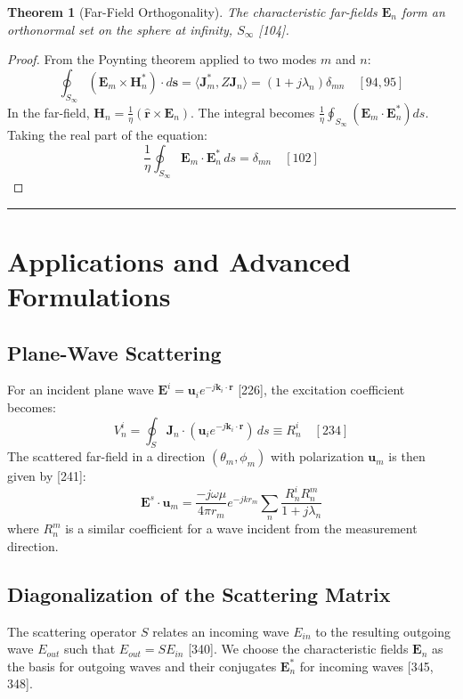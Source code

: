 \documentclass[11pt]{article}
\newcommand{\vect}[1]{\mathbf{#1}}
\newcommand{\sprod}[2]{\langle #1, #2 \rangle}
\newtheorem{theorem}{Theorem}[section]
\theoremstyle{definition}
\begin{document}
\begin{theorem}[Far-Field Orthogonality]
The characteristic far-fields $\vect{E}_n$ form an orthonormal set on the sphere at infinity, $S_\infty$ [104].
\end{theorem}
\begin{proof}
From the Poynting theorem applied to two modes $m$ and $n$:
\[ \oint_{S_\infty} (\vect{E}_m \times \vect{H}_n^*) \cdot d\vect{s} = \sprod{\vect{J}_m^*}{Z\vect{J}_n} = (1+j\lambda_n)\delta_{mn} \quad [94, 95] \]
In the far-field, $\vect{H}_n = \frac{1}{\eta}(\hat{\vect{r}} \times \vect{E}_n)$. The integral becomes $\frac{1}{\eta} \oint_{S_\infty} (\vect{E}_m \cdot \vect{E}_n^*) ds$. Taking the real part of the equation:
\begin{equation}
\frac{1}{\eta} \oint_{S_\infty} \vect{E}_m \cdot \vect{E}_n^* \, ds = \delta_{mn} \quad [102]
\end{equation}
\end{proof}

\hrule\vspace{1.5em}

\section{Applications and Advanced Formulations}

\subsection{Plane-Wave Scattering}
For an incident plane wave $\vect{E}^i = \vect{u}_i e^{-j\vect{k}_i \cdot \vect{r}}$ [226], the excitation coefficient becomes:
\begin{equation}
V_n^i = \oint_S \vect{J}_n \cdot (\vect{u}_i e^{-j\vect{k}_i \cdot \vect{r}}) \, ds \equiv R_n^i \quad [234]
\end{equation}
The scattered far-field in a direction $(\theta_m, \phi_m)$ with polarization $\vect{u}_m$ is then given by [241]:
\begin{equation}
\vect{E}^s \cdot \vect{u}_m = \frac{-j\omega\mu}{4\pi r_m} e^{-jkr_m} \sum_n \frac{R_n^i R_n^m}{1+j\lambda_n}
\end{equation}
where $R_n^m$ is a similar coefficient for a wave incident from the measurement direction.

\subsection{Diagonalization of the Scattering Matrix}
The scattering operator $S$ relates an incoming wave $E_{in}$ to the resulting outgoing wave $E_{out}$ such that $E_{out} = S E_{in}$ [340]. We choose the characteristic fields $\vect{E}_n$ as the basis for outgoing waves and their conjugates $\vect{E}_n^*$ for incoming waves [345, 348].
\end{document}
